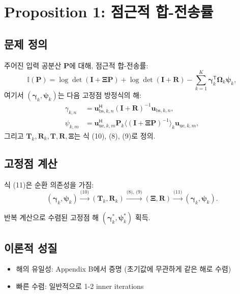 \documentclass[10pt]{article}
\begin{document}
\section{Proposition 1: 점근적 합-전송률}

\subsection{문제 정의}

주어진 입력 공분산 $\mathbf{P}$에 대해, 점근적 합-전송률:
\begin{equation}
\mathbb{I}(\mathbf{P}) = \log \det(\mathbf{I} + \boldsymbol{\Xi} \mathbf{P}) + \log \det(\mathbf{I} + \mathbf{R}) - \sum_{k=1}^{K} \boldsymbol{\gamma}_k^{\mathsf{T}} \boldsymbol{\Omega}_k \boldsymbol{\psi}_k, \tag{7}
\end{equation}
여기서 $(\boldsymbol{\gamma}_k, \boldsymbol{\psi}_k)$는 다음 고정점 방정식의 해:
\begin{align}
\gamma_{k,n} &= \mathbf{u}_{\text{bs},k,n}^{\mathsf{H}} (\mathbf{I} + \mathbf{R})^{-1} \mathbf{u}_{\text{bs},k,n}, \tag{11a}\\
\psi_{k,m} &= \mathbf{u}_{\text{ue},k,m}^{\mathsf{H}} \mathbf{P}_k \langle (\mathbf{I} + \boldsymbol{\Xi} \mathbf{P})^{-1} \rangle_k \mathbf{u}_{\text{ue},k,m}, \tag{11b}
\end{align}
그리고 $\mathbf{T}_k, \mathbf{R}_k, \mathbf{T}, \mathbf{R}, \boldsymbol{\Xi}$는 식 (10), (8), (9)로 정의.

\subsection{고정점 계산}

식 (11)은 순환 의존성을 가짐:
\[
(\boldsymbol{\gamma}_k, \boldsymbol{\psi}_k) \xrightarrow{\text{(10)}} (\mathbf{T}_k, \mathbf{R}_k) \xrightarrow{\text{(8), (9)}} (\boldsymbol{\Xi}, \mathbf{R}) \xrightarrow{\text{(11)}} (\boldsymbol{\gamma}_k, \boldsymbol{\psi}_k).
\]

반복 계산으로 수렴된 고정점 해 $(\boldsymbol{\gamma}_k^*, \boldsymbol{\psi}_k^*)$ 획득.

\subsection{이론적 성질}

\begin{itemize}
\item 해의 유일성: Appendix B에서 증명 (초기값에 무관하게 같은 해로 수렴)
\item 빠른 수렴: 일반적으로 1-2 inner iterations
\end{itemize}
\end{document}
